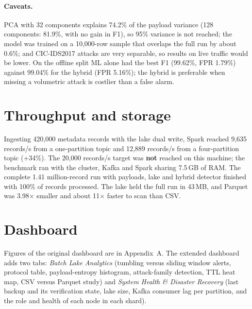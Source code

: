 \paragraph{Caveats.} PCA with 32 components explains 74.2\% of the payload variance (128 components: 81.9\%, with no gain in F1), so 95\% variance is not reached; the model was trained on a 10,000-row sample that overlaps the full run by about 0.6\%; and CIC-IDS2017 attacks are very separable, so results on live traffic would be lower. On the offline split ML alone had the best F1 (99.62\%, FPR 1.79\%) against 99.04\% for the hybrid (FPR 5.16\%); the hybrid is preferable when missing a volumetric attack is costlier than a false alarm.

\section{Throughput and storage}
\paragraph{}
Ingesting 420,000 metadata records with the lake dual write, Spark reached 9,635 records/s from a one-partition topic and 12,889 records/s from a four-partition topic (+34\%). The 20,000 records/s target was \textbf{not} reached on this machine; the benchmark ran with the cluster, Kafka and Spark sharing 7.5\,GB of RAM. The complete 1.41 million-record run with payloads, lake and hybrid detector finished with 100\% of records processed. The lake held the full run in 43\,MB, and Parquet was 3.98$\times$ smaller and about 11$\times$ faster to scan than CSV.

\section{Dashboard}
\paragraph{}
Figures of the original dashboard are in Appendix~A. The extended dashboard adds two tabs: \emph{Batch Lake Analytics} (tumbling versus sliding window alerts, protocol table, payload-entropy histogram, attack-family detection, TTL heat map, CSV versus Parquet study) and \emph{System Health \& Disaster Recovery} (last backup and its verification state, lake size, Kafka consumer lag per partition, and the role and health of each node in each shard).
